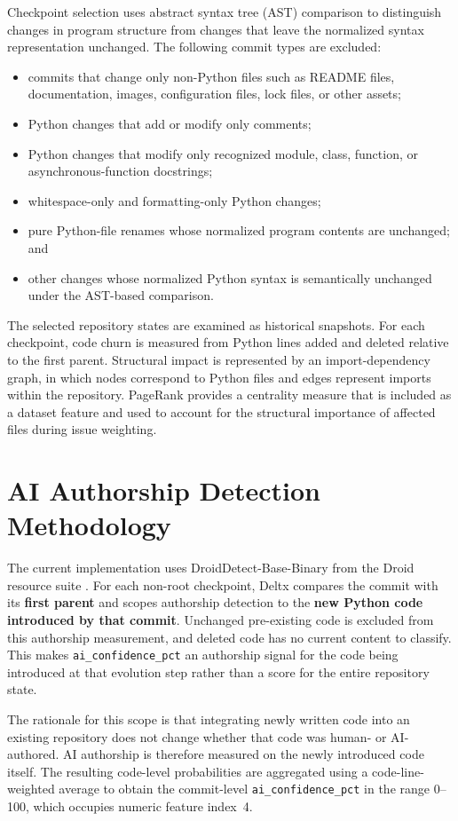 \documentclass[12pt,a4paper,oneside]{report}
\newcommand{\code}[1]{\nolinkurl{#1}}
\begin{document}
Checkpoint selection uses abstract syntax tree (AST) comparison to distinguish changes in program structure from changes that leave the normalized syntax representation unchanged. The following commit types are excluded:
\begin{itemize}
    \item commits that change only non-Python files such as README files, documentation, images, configuration files, lock files, or other assets;
    \item Python changes that add or modify only comments;
    \item Python changes that modify only recognized module, class, function, or asynchronous-function docstrings;
    \item whitespace-only and formatting-only Python changes;
    \item pure Python-file renames whose normalized program contents are unchanged; and
    \item other changes whose normalized Python syntax is semantically unchanged under the AST-based comparison.
\end{itemize}

The selected repository states are examined as historical snapshots. For each checkpoint, code churn is measured from Python lines added and deleted relative to the first parent. Structural impact is represented by an import-dependency graph, in which nodes correspond to Python files and edges represent imports within the repository. PageRank provides a centrality measure that is included as a dataset feature and used to account for the structural importance of affected files during issue weighting.

\section{AI Authorship Detection Methodology}
The current implementation uses DroidDetect-Base-Binary from the Droid resource suite \citep{orel2025droid}. For each non-root checkpoint, Deltx compares the commit with its \textbf{first parent} and scopes authorship detection to the \textbf{new Python code introduced by that commit}. Unchanged pre-existing code is excluded from this authorship measurement, and deleted code has no current content to classify. This makes \code{ai\_confidence\_pct} an authorship signal for the code being introduced at that evolution step rather than a score for the entire repository state.

The rationale for this scope is that integrating newly written code into an existing repository does not change whether that code was human- or AI-authored. AI authorship is therefore measured on the newly introduced code itself. The resulting code-level probabilities are aggregated using a code-line-weighted average to obtain the commit-level \code{ai\_confidence\_pct} in the range 0--100, which occupies numeric feature index~4.
\end{document}
